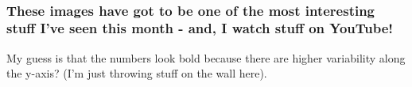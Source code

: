 \documentclass[11pt]{article}
\begin{document}
    \begin{center}
    \end{center}
    { \hspace*{\fill} \\}
    
    \subsubsection{These images have got to be one of the most interesting
stuff I've seen this month - and, I watch stuff on
YouTube!}\label{these-images-have-got-to-be-one-of-the-most-interesting-stuff-ive-seen-this-month---and-i-watch-stuff-on-youtube}

My guess is that the numbers look bold because there are higher
variability along the y-axis? (I'm just throwing stuff on the wall
here).


    
    
    
    
\end{document}
